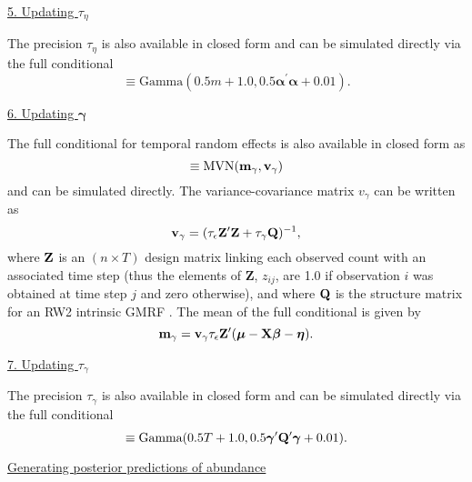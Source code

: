 \documentclass[12pt,fleqn]{article}
\begin{document}
\begin{flushleft}
\underline{5. Updating $\tau_\eta$}

The precision $\tau_\eta$ is also available in closed form and can be simulated directly via the full conditional
\begin{equation*}
  [\tau_\eta | \cdot] \equiv \textrm{Gamma}(0.5m + 1.0,0.5 \boldsymbol{\alpha}^\prime \boldsymbol{\alpha} + 0.01).
\end{equation*}

\underline{6. Updating $\boldsymbol{\gamma}$}

The full conditional for temporal random effects is also available in closed form as
\begin{equation*}
  [\boldsymbol{\gamma} | \cdot] \equiv \textrm{MVN}({\bf m}_{\gamma},{\bf v}_{\gamma})
\end{equation*}
and can be simulated directly.  The variance-covariance matrix $v_{\gamma}$ can be written as
\begin{equation*}
  {\bf v}_{\gamma} = (\tau_\epsilon {\bf Z}^\prime {\bf Z} + \tau_\gamma{\bf Q})^{-1},
\end{equation*}
where ${\bf Z}$ is an $(n \times T)$ design matrix linking each observed count with an associated time step (thus the elements of {\bf Z}, $z_{ij}$, are 1.0 if observation $i$ was obtained at time step $j$ and zero otherwise), and where ${\bf Q}$ is the structure matrix for an RW2 intrinsic GMRF \citep[see][section 3.4]{RueHeld2005}.  The mean of the full conditional is given by
\begin{equation*}
  {\bf m}_{\gamma} = {\bf v}_\gamma \tau_\epsilon {\bf Z}^\prime (\boldsymbol{\mu}- {\bf X} \boldsymbol{\beta} - \boldsymbol{\eta}).
\end{equation*}

\underline{7. Updating $\tau_\gamma$}

The precision $\tau_\gamma$ is also available in closed form and can be simulated directly via the full conditional
\begin{equation*}
  [\tau_\gamma | \cdot] \equiv \textrm{Gamma}(0.5T + 1.0,0.5 \boldsymbol{\gamma}^\prime {\bf Q}^\prime \boldsymbol{\gamma} + 0.01).
\end{equation*}


\underline{Generating posterior predictions of abundance}


\end{flushleft}
\end{document}
